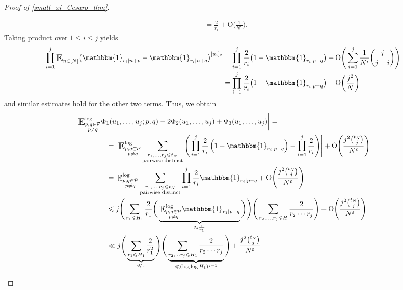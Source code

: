 \documentclass[letter,11pt]{article}
\theoremstyle{plain} %
\theoremstyle{definition} %
\theoremstyle{plain}
\theoremstyle{plain}
\theoremstyle{plain}
\numberwithin{equation}{section}
\newcommand{\Oh}{{\mathrm O}}
\renewcommand{\epsilon}{\varepsilon}
\renewcommand{\leq}{\leqslant}
\newcommand{\E}{\raisebox{-0.4ex}{\scalebox{1.4}[1.3]{$\mathbb{E}$}}}
\newcommand{\Esub}[1]{\raisebox{-0.4ex}{\scalebox{1.4}[1.3]{$\mathbb{E}$}}\raisebox{-0.35ex}{\ensuremath{_{\scriptstyle #1}}}}
\newcommand{\logE}{{\E}^{\log}}
\newcommand{\1}{\mathbbm{1}}
\newcommand{\Pc}{\mathcal{P}}
\begin{document}
\begin{proof}[Proof of \cref{small_xi_Cesaro_thm}]
\begin{itemize}
\begin{align*}
        & = \frac{2}{r_i}+\Oh\bigg(\frac{1}{N^\epsilon}\bigg).
    \end{align*}
    Taking product over $1\leq i \leq j$ yields
    \begin{align*}
        \prod_{i=1}^j \Esub{n\in[N]}\big(\1_{r_i\mid n+p}-\1_{r_i\mid n+q}\big)^{[u_i]_2}
        & = \prod_{i=1}^j \frac{2}{r_i}\big(1-\1_{r_i\mid p-q}\big) + \Oh\Bigg(\sum_{i=1}^j \frac{1}{N^i}\binom{j}{j-i}\Bigg) \\
        & = \prod_{i=1}^j \frac{2}{r_i}\big(1-\1_{r_i\mid p-q}\big) + \Oh\bigg(\frac{j^2}{N}\bigg)
    \end{align*}
    and similar estimates hold for the other two terms. Thus, we obtain
    \begin{align*}
        & \bigg|\logE_{\substack{p,q\in\Pc \\ p\neq q}} 
        \Phi_1(u_1,\ldots,u_j;p,q)-2\Phi_2(u_1,\ldots,u_j) + \Phi_3(u_1,\ldots,u_j)\bigg| =
        \\
        & \hspace*{1.5cm} = \Bigg|\logE_{\substack{p,q\in\Pc \\ p\neq q}}
        \sum_{\substack{r_1,\ldots,r_j\leq t_N \\ \text{pairwise distinct}}}\Bigg(
        \prod_{i=1}^{j}\frac{2}{r_i}\left(1-\1_{r_i\mid p-q}\right) - 
        \prod_{i=1}^{j}\frac{2}{r_i}\Bigg)\Bigg|
        + \Oh\Bigg(\frac{j^2\binom{t_N}{j}}{N^\epsilon}\Bigg)
        \\
        & \hspace*{1.5cm} = \logE_{\substack{p,q\in\Pc \\ p\neq q}}\sum_{\substack{r_1,\ldots,r_j\leq t_N \\ \text{pairwise distinct}}}\prod_{i=1}^j\frac{2}{r_i}\1_{r_i\mid p-q} + \Oh\Bigg(\frac{j^2\binom{t_N}{j}}{N^\epsilon}\Bigg) \\
        & \hspace*{1.5cm} \leq j \Bigg(\sum_{r_1\leq H_1}\frac{2}{r_1}\bigg(\underbrace{\logE_{\substack{p,q\in\Pc \\ p\neq q}}\1_{r_1\mid p-q}}_{\approx\frac{1}{r_1}}\bigg)\Bigg) \Bigg(\sum_{r_2,\ldots,r_j\leq H}\frac{2}{r_2\cdots r_j}\Bigg) + \Oh\Bigg(\frac{j^2\binom{t_N}{j}}{N^\epsilon}\Bigg) \\
        & \hspace*{1.5cm} \ll j \Bigg(\underbrace{\sum_{r_1\leq H_1}\frac{2}{r_1^2}}_{\ll 1}\Bigg) \Bigg(\underbrace{\sum_{r_2,\ldots r_j\leq H_1}\frac{2}{r_2\cdots r_j}}_{\ll (\log\log{H_1})^{j-1}}\Bigg) + \frac{j^2\binom{t_N}{j}}{N^\epsilon}

\end{align*}
\end{itemize}
\end{proof}
\end{document}

